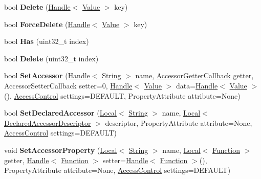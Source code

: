 \begin{DoxyCompactItemize}
\item 
\hypertarget{classv8_1_1Object_a6850815e31ba9fc75d368c69892cfd8b}{bool {\bfseries Delete} (\hyperlink{classv8_1_1Handle}{Handle}$<$ \hyperlink{classv8_1_1Value}{Value} $>$ key)}\label{classv8_1_1Object_a6850815e31ba9fc75d368c69892cfd8b}

\item 
\hypertarget{classv8_1_1Object_a8e7f3b8b70eb17bcb5cc087d5b6746d6}{bool {\bfseries Force\-Delete} (\hyperlink{classv8_1_1Handle}{Handle}$<$ \hyperlink{classv8_1_1Value}{Value} $>$ key)}\label{classv8_1_1Object_a8e7f3b8b70eb17bcb5cc087d5b6746d6}

\item 
\hypertarget{classv8_1_1Object_ac547af2f2d256d96991ff20159a44bfd}{bool {\bfseries Has} (uint32\-\_\-t index)}\label{classv8_1_1Object_ac547af2f2d256d96991ff20159a44bfd}

\item 
\hypertarget{classv8_1_1Object_a63f88a22cb5d994eedc1efc79520bc42}{bool {\bfseries Delete} (uint32\-\_\-t index)}\label{classv8_1_1Object_a63f88a22cb5d994eedc1efc79520bc42}

\item 
\hypertarget{classv8_1_1Object_a7590761426aae338f6ab308ff65d491c}{bool {\bfseries Set\-Accessor} (\hyperlink{classv8_1_1Handle}{Handle}$<$ \hyperlink{classv8_1_1String}{String} $>$ name, \hyperlink{namespacev8_a2676a71943fdebd2e0a09fc256de6ff9}{Accessor\-Getter\-Callback} getter, Accessor\-Setter\-Callback setter=0, \hyperlink{classv8_1_1Handle}{Handle}$<$ \hyperlink{classv8_1_1Value}{Value} $>$ data=\hyperlink{classv8_1_1Handle}{Handle}$<$ \hyperlink{classv8_1_1Value}{Value} $>$(), \hyperlink{namespacev8_a31d8355cb043d7d2dda3f4a52760b64e}{Access\-Control} settings=D\-E\-F\-A\-U\-L\-T, Property\-Attribute attribute=None)}\label{classv8_1_1Object_a7590761426aae338f6ab308ff65d491c}

\item 
\hypertarget{classv8_1_1Object_afa3eb22c17e71689260fe2b1079705ef}{bool {\bfseries Set\-Declared\-Accessor} (\hyperlink{classv8_1_1Local}{Local}$<$ \hyperlink{classv8_1_1String}{String} $>$ name, \hyperlink{classv8_1_1Local}{Local}$<$ \hyperlink{classv8_1_1DeclaredAccessorDescriptor}{Declared\-Accessor\-Descriptor} $>$ descriptor, Property\-Attribute attribute=None, \hyperlink{namespacev8_a31d8355cb043d7d2dda3f4a52760b64e}{Access\-Control} settings=D\-E\-F\-A\-U\-L\-T)}\label{classv8_1_1Object_afa3eb22c17e71689260fe2b1079705ef}

\item 
\hypertarget{classv8_1_1Object_a4ba2e3e2de77181a0aa48c55c94d2917}{void {\bfseries Set\-Accessor\-Property} (\hyperlink{classv8_1_1Local}{Local}$<$ \hyperlink{classv8_1_1String}{String} $>$ name, \hyperlink{classv8_1_1Local}{Local}$<$ \hyperlink{classv8_1_1Function}{Function} $>$ getter, \hyperlink{classv8_1_1Handle}{Handle}$<$ \hyperlink{classv8_1_1Function}{Function} $>$ setter=\hyperlink{classv8_1_1Handle}{Handle}$<$ \hyperlink{classv8_1_1Function}{Function} $>$(), Property\-Attribute attribute=None, \hyperlink{namespacev8_a31d8355cb043d7d2dda3f4a52760b64e}{Access\-Control} settings=D\-E\-F\-A\-U\-L\-T)}\label{classv8_1_1Object_a4ba2e3e2de77181a0aa48c55c94d2917}


\end{DoxyCompactItemize}
